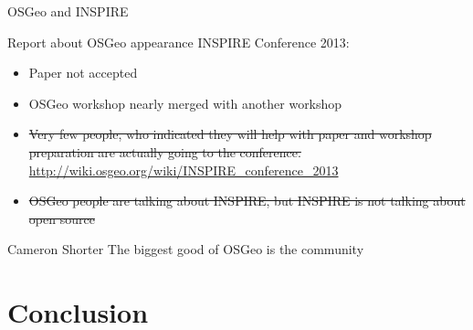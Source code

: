 \documentclass[xcolor=dvipsnames]{beamer}
\begin{document}
\begin{frame}{OSGeo and INSPIRE}



    Report about OSGeo appearance INSPIRE Conference 2013:
    \begin{itemize}
        \item Paper not accepted
        \pause
        \item OSGeo workshop nearly merged with another workshop
        \pause
        \item \sout{Very few people, who indicated they will help with paper and
            workshop preparation are actually going to the conference.}
            \url{http://wiki.osgeo.org/wiki/INSPIRE_conference_2013}
        \pause
        \item \sout{OSGeo people are talking about INSPIRE, but INSPIRE is not talking
            about open source}
    \end{itemize}
    \pause

    \begin{block}{Cameron Shorter}
        The biggest good of OSGeo is the community
    \end{block}


\end{frame}




\section*{Conclusion}
\end{document}
